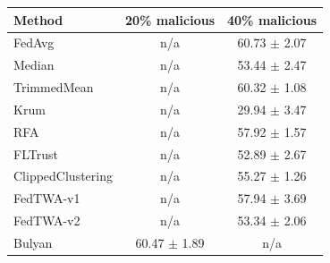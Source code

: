 \begin{tabular}{lcc}
\toprule
Method & 20\% malicious & 40\% malicious \\
\midrule
FedAvg & n/a & 60.73 $\pm$ 2.07 \\
Median & n/a & 53.44 $\pm$ 2.47 \\
TrimmedMean & n/a & 60.32 $\pm$ 1.08 \\
Krum & n/a & 29.94 $\pm$ 3.47 \\
RFA & n/a & 57.92 $\pm$ 1.57 \\
FLTrust & n/a & 52.89 $\pm$ 2.67 \\
ClippedClustering & n/a & 55.27 $\pm$ 1.26 \\
FedTWA-v1 & n/a & 57.94 $\pm$ 3.69 \\
FedTWA-v2 & n/a & 53.34 $\pm$ 2.06 \\
Bulyan & 60.47 $\pm$ 1.89 & n/a \\
\bottomrule
\end{tabular}